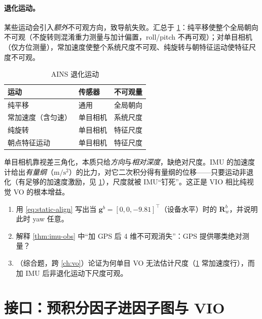 \paragraph{退化运动。}
某些运动会引入\emph{额外}不可观方向，致导航失败。汇总于 \cref{tab:imu-degenerate}：纯平移使整个全局朝向不可观（不旋转则混淆重力测量与加计偏置，roll/pitch 不再可观）；对单目相机（仅方位测量），常加速度使整个系统尺度不可观、纯旋转与朝特征运动使特征尺度不可观\cite{carlone2026handbook}。

\begin{table}[H]\centering\small
\caption{AINS 退化运动\cite{carlone2026handbook}}
\label{tab:imu-degenerate}
\begin{tabular}{lll}
\toprule
运动 & 传感器 & 不可观量 \\
\midrule
纯平移 & 通用 & 全局朝向 \\
常加速度（含匀速） & 单目相机 & 系统尺度 \\
纯旋转 & 单目相机 & 特征尺度 \\
朝点特征运动 & 单目相机 & 特征尺度 \\
\bottomrule
\end{tabular}
\end{table}

\begin{insight}\label{ins:imu-scale}
单目相机靠视差三角化，本质只给\emph{方向}与\emph{相对深度}，缺绝对尺度。IMU 的加速度计给出\emph{有量纲}（$\mathrm{m/s^2}$）的比力，对它二次积分得有量纲的位移——只要运动非退化（有足够的加速度激励，见 \cref{tab:imu-degenerate}），尺度就被 IMU“钉死”。这正是 VIO 相比纯视觉 VO 的根本增益。
\end{insight}

\begin{practice}
\begin{enumerate}
  \item 用 \cref{eq:static-align} 写出当 $\mathbf g^b=[0,0,-9.81]^\top$（设备水平）时的 $\mathbf R_w^b$，并说明此时 yaw 任意。
  \item 解释 \cref{thm:imu-obs} 中“加 GPS 后 4 维不可观消失”：GPS 提供哪类绝对测量？
  \item （综合题，跨 \cref{ch:vo}）论证为何单目 VO 无法估计尺度（\cref{tab:imu-degenerate} 常加速度行），而加 IMU 后非退化运动下尺度可观。
\end{enumerate}
\end{practice}

\section{接口：预积分因子进因子图与 VIO}
\label{sec:imu-interface}

